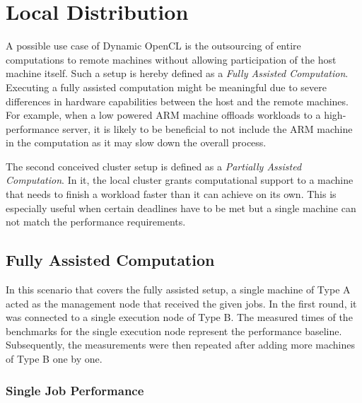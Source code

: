 \section{Local Distribution}
\label{local_distribution}
A possible use case of Dynamic OpenCL is the outsourcing of entire computations to remote machines without allowing participation of the host machine itself. Such a setup is hereby defined as a \textit{Fully Assisted Computation}. Executing a fully assisted computation might be meaningful due to severe differences in hardware capabilities between the host and the remote machines. For example, when a low powered ARM machine offloads workloads to a high-performance server, it is likely to be beneficial to not include the ARM machine in the computation as it may slow down the overall process.

The second conceived cluster setup is defined as a \textit{Partially Assisted Computation}. In it, the local cluster grants computational support to a machine that needs to finish a workload faster than it can achieve on its own. This is especially useful when certain deadlines have to be met but a single machine can not match the performance requirements.

\subsection{Fully Assisted Computation}
In this scenario that covers the fully assisted setup, a single machine of Type A acted as the management node that received the given jobs. In the first round, it was connected to a single execution node of Type B. The measured times of the benchmarks for the single execution node represent the performance baseline. Subsequently, the measurements were then repeated after adding more machines of Type B one by one.

\subsubsection*{Single Job Performance}

